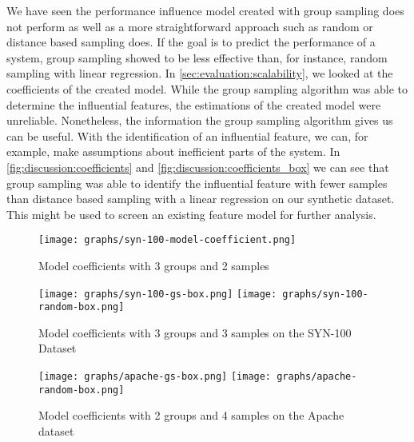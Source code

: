 \documentclass[../thesis.tex]{subfiles}
\begin{document}
We have seen the performance influence model created with group sampling does not perform as well
as a more straightforward approach such as random or distance based sampling does. If the goal is to predict
the performance of a system, group sampling showed to be less effective than, for instance, random sampling with linear regression.
In \autoref{sec:evaluation:scalability}, we looked at the coefficients of the created model.
While the group sampling algorithm was able to determine the influential features, the
estimations of the created model were unreliable. Nonetheless, the information the group sampling
algorithm gives us can be useful. With the identification of an influential feature, we can, for example, make assumptions
about inefficient parts of the system.
In \autoref{fig:discussion:coefficients} and \autoref{fig:discussion:coefficients_box} we can see that group sampling was able to identify
the influential feature with fewer samples than distance based sampling with a linear regression
on our synthetic dataset. This might be used to screen an existing feature model for further analysis.

\begin{figure}[h]
      \begin{center}
            \texttt{[image: graphs/syn-100-model-coefficient.png]}
      \end{center}
      \caption[Model coefficients - SYN-100 dataset]{
            Model coefficients with 3 groups and 2 samples
      }\label{fig:discussion:coefficients}
\end{figure}





\begin{figure}[h]
      \begin{center}
            \texttt{[image: graphs/syn-100-gs-box.png]}
            \texttt{[image: graphs/syn-100-random-box.png]}
      \end{center}
      \caption[Model coefficients - SYN-100 dataset - Box plot]{
            Model coefficients with 3 groups and 3 samples on the SYN-100 Dataset
      }\label{fig:discussion:coefficients_box}
\end{figure}

\begin{figure}[h]
      \begin{center}
            \texttt{[image: graphs/apache-gs-box.png]}
            \texttt{[image: graphs/apache-random-box.png]}
      \end{center}
      \caption[Model coefficients - Apache dataset - Box plot]{
            Model coefficients with 2 groups and 4 samples on the Apache dataset
      }\label{fig:discussion:coefficients_box_apache}
\end{figure}
\end{document}

